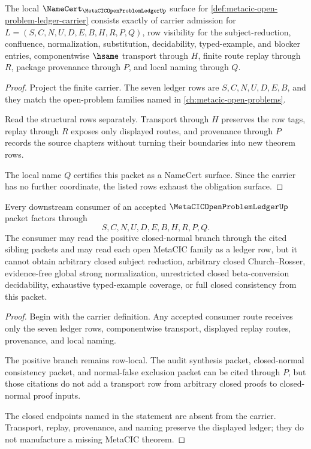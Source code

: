 \begin{theorem}
\label{thm:metacic-open-problem-ledger-namecert-obligations}
The local $\NameCert_{\MetaCICOpenProblemLedgerUp}$ surface for \autoref{def:metacic-open-problem-ledger-carrier} consists exactly of carrier admission for $L=(S,C,N,U,D,E,B,H,R,P,Q)$, row visibility for the subject-reduction, confluence, normalization, substitution, decidability, typed-example, and blocker entries, componentwise $\hsame$ transport through $H$, finite route replay through $R$, package provenance through $P$, and local naming through $Q$.
\end{theorem}
\begin{proof}
Project the finite carrier. The seven ledger rows are $S,C,N,U,D,E,B$, and they match the open-problem families named in \autoref{ch:metacic-open-problems}.

Read the structural rows separately. Transport through $H$ preserves the row tags, replay through $R$ exposes only displayed routes, and provenance through $P$ records the source chapters without turning their boundaries into new theorem rows.

The local name $Q$ certifies this packet as a NameCert surface. Since the carrier has no further coordinate, the listed rows exhaust the obligation surface.
\end{proof}

\begin{theorem}
\label{thm:metacic-open-problem-ledger-nonescape}
Every downstream consumer of an accepted $\MetaCICOpenProblemLedgerUp$ packet factors through
$$
S,C,N,U,D,E,B,H,R,P,Q.
$$
The consumer may read the positive closed-normal branch through the cited sibling packets and may read each open MetaCIC family as a ledger row, but it cannot obtain arbitrary closed subject reduction, arbitrary closed Church--Rosser, evidence-free global strong normalization, unrestricted closed beta-conversion decidability, exhaustive typed-example coverage, or full closed consistency from this packet.
\end{theorem}
\begin{proof}
Begin with the carrier definition. Any accepted consumer route receives only the seven ledger rows, componentwise transport, displayed replay routes, provenance, and local naming.

The positive branch remains row-local. The audit synthesis packet, closed-normal consistency packet, and normal-false exclusion packet can be cited through $P$, but those citations do not add a transport row from arbitrary closed proofs to closed-normal proof inputs.

The closed endpoints named in the statement are absent from the carrier. Transport, replay, provenance, and naming preserve the displayed ledger; they do not manufacture a missing MetaCIC theorem.
\end{proof}

